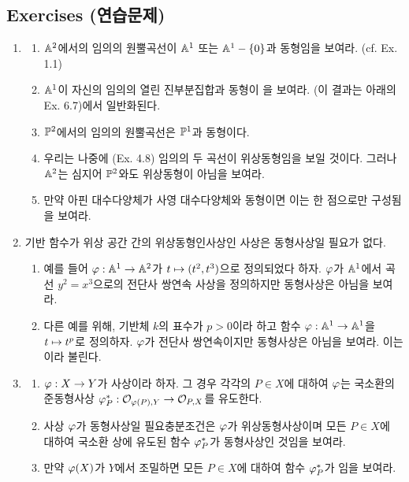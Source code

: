	
	
	\subsection*{Exercises (연습문제)}
	
	\begin{enumerate}[label=\tb{3.\arabic*.},itemindent=0mm,itemsep=2mm]
	\item \begin{enumerate}[label=(\alph*)]
	\item $\mathbb{A}^2$에서의 임의의 원뿔곡선이 $\mathbb{A}^1$ 또는 $\mathbb{A}^1-\{0\}$과 동형임을 보여라. (cf. Ex. 1.1)
	\item $\mathbb{A}^1$이 자신의 임의의 열린 진부분집합과 동형이 을 보여라.
	(이 결과는 아래의 Ex. 6.7)에서 일반화된다.
	\item $\mathbb{P}^2$에서의 임의의 원뿔곡선은 $\mathbb{P}^1$과 동형이다.
	\item 우리는 나중에 (Ex. 4.8) 임의의 두 곡선이 위상동형임을 보일 것이다.
	그러나 $\mathbb{A}^2$는 심지어 $\mathbb{P}^2$와도 위상동형이 아님을 보여라.
	\item 만약 아핀 대수다양체가 사영 대수다양체와 동형이면 이는 한 점으로만 구성됨을 보여라.
	\end{enumerate}
	\item 기반 함수가 위상 공간 간의 위상동형인사상인 사상은 동형사상일 필요가 없다.
	\begin{enumerate}[label=(\alph*)]
	\item 예를 들어 $\varphi:\mathbb{A}^1\rightarrow\mathbb{A}^2$가 $t\mapsto(t^2,t^3)$으로 정의되었다 하자.
	$\varphi$가 $\mathbb{A}^1$에서 곡선 $y^2=x^3$으로의 전단사 쌍연속 사상을 정의하지만 동형사상은 아님을 보여라.
	\item 다른 예를 위해, 기반체 $k$의 표수가 $p>0$이라 하고 함수 $\varphi:\mathbb{A}^1\rightarrow\mathbb{A}^1$을 $t\mapsto t^p$로 정의하자.
	$\varphi$가 전단사 쌍연속이지만 동형사상은 아님을 보여라. 이는 이라 불린다.
	\end{enumerate}
	\item \begin{enumerate}[label=(\alph*)]
	\item $\varphi:X\rightarrow Y$가 사상이라 하자. 그 경우 각각의 $P\in X$에 대하여
	$\varphi$는 국소환의 준동형사상 $\varphi_P^*:\mathcal{O}_{\varphi(P),Y}\rightarrow\mathcal{O}_{P,X}$를 유도한다.
	\item 사상 $\varphi$가 동형사상일 필요충분조건은 $\varphi$가 위상동형사상이며
	모든 $P\in X$에 대하여 국소환 상에 유도된 함수 $\varphi_P^*$가 동형사상인 것임을 보여라.
	\item 만약 $\varphi(X)$가 $Y$에서 조밀하면 모든 $P\in X$에 대하여 함수 $\varphi_P^*$가 임을 보여라.

\end{enumerate}
\end{enumerate}
